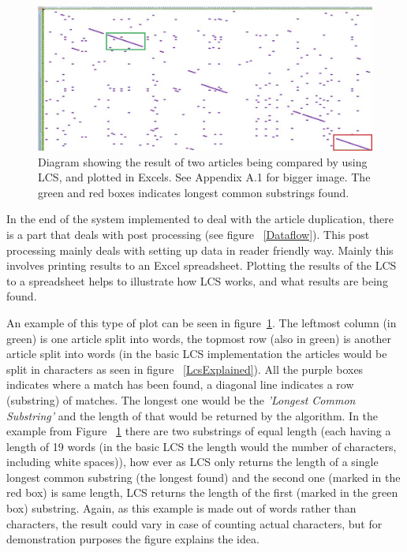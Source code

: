 \begin{figure}
	\centering
	\includegraphics[scale=0.4]{figures/LcsExample}
	\caption{Diagram showing the result of two articles being compared by using LCS, and plotted in Excels. See Appendix A.1 for bigger image. The green and red boxes indicates longest common substrings found.}
	\label{LcsEx}
\end{figure}

In the end of the system implemented to deal with the article duplication, there is a part that deals with post processing (see figure ~\ref{Dataflow}). This post processing mainly deals with setting up data in reader friendly way. Mainly this involves printing results to an Excel spreadsheet. Plotting the results of the LCS to a spreadsheet helps to illustrate how LCS works, and what results are being found. 

An example of this type of plot can be seen in figure~\ref{LcsEx}. The leftmost column (in green) is one article split into words, the topmost row (also in green) is another article split into words (in the basic LCS implementation the articles would be split in characters as seen in figure ~\ref{LcsExplained}). All the purple boxes indicates where a match has been found, a diagonal line indicates a row (substring) of matches. The longest one would be the \textit{'Longest Common Substring'} and the length of that would be returned by the algorithm. In the example from Figure ~\ref{LcsEx} there are two substrings of equal length (each having a length of 19 words (in the basic LCS the length would the number of characters, including white spaces)), how ever as LCS only returns the length of a single longest common substring (the longest found) and the second one (marked in the red box) is same length, LCS returns the length of the first (marked in the green box) substring. Again, as this example is made out of words rather than characters, the result could vary in case of counting actual characters, but for demonstration purposes the figure explains the idea.

